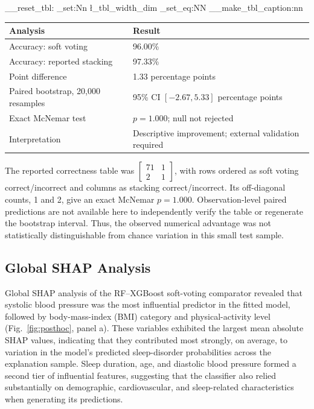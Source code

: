 \documentclass[a4paper,fleqn]{cas-dc}
\begin{document}
\par\nopagebreak\smallskip
\noindent\begin{minipage}{\columnwidth}
\centering
\makeatletter
\ExplSyntaxOn
\__reset_tbl:
\dim_set:Nn \l_tbl_width_dim { \columnwidth }
\cs_set_eq:NN \@makecaption \__make_tbl_caption:nn
\ExplSyntaxOff
\makeatother
{}
\label{tab:stats}
\footnotesize
\setlength{\tabcolsep}{3pt}
\renewcommand{\arraystretch}{1.05}
\begin{tabularx}{\columnwidth}{@{}Q{0.42\columnwidth}Y@{}}
\toprule
Analysis & Result \\
\midrule
Accuracy: soft voting & 96.00\% \\
Accuracy: reported stacking & 97.33\% \\
Point difference & 1.33 percentage points \\
Paired bootstrap, 20,000 resamples & 95\% CI $[-2.67,5.33]$ percentage points \\
Exact McNemar test & $p=1.000$; null not rejected \\
Interpretation & Descriptive improvement; external validation required \\
\bottomrule
\end{tabularx}
\end{minipage}
\par\smallskip

The reported correctness table was $\begin{bmatrix}71&1\\2&1\end{bmatrix}$, with rows ordered as soft voting correct/incorrect and columns as stacking correct/incorrect. Its off-diagonal counts, 1 and 2, give an exact McNemar $p=1.000$. Observation-level paired predictions are not available here to independently verify the table or regenerate the bootstrap interval. Thus, the observed numerical advantage was not statistically distinguishable from chance variation in this small test sample.


\subsection{Global SHAP Analysis}
\label{sec:globalshap}

Global SHAP analysis of the RF--XGBoost soft-voting comparator revealed that
systolic blood pressure was the most influential predictor in the fitted model,
followed by body-mass-index (BMI) category and physical-activity level
(Fig.~\ref{fig:posthoc}, panel a). These variables exhibited the largest mean
absolute SHAP values, indicating that they contributed most strongly, on
average, to variation in the model's predicted sleep-disorder probabilities
across the explanation sample. Sleep duration, age, and diastolic blood pressure
formed a second tier of influential features, suggesting that the classifier
also relied substantially on demographic, cardiovascular, and sleep-related
characteristics when generating its predictions.
\end{document}
